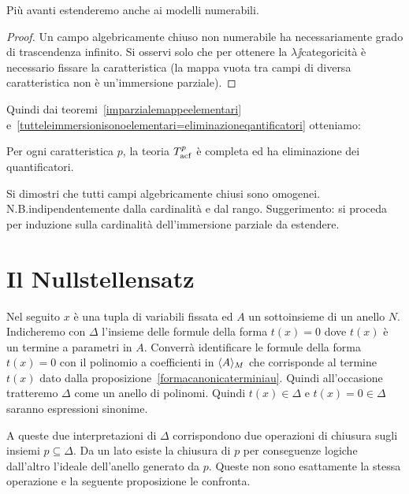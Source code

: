 Pi\`u avanti estenderemo  anche ai modelli numerabili.

\begin{proof}
Un campo algebricamente chiuso non numerabile ha necessariamente grado di trascendenza infinito. Si osservi solo che per ottenere la $\lambda\jj$categoricit\`a \`e necessario fissare la caratteristica (la mappa vuota tra campi di diversa caratteristica non \`e un'immersione parziale).\end{proof}

Quindi dai teoremi~\ref{imparzialemappeelementari} e~\ref{tutteleimmersionisonoelementari=eliminazioneqantificatori} otteniamo:

\begin{corollary}\label{corol_acfElQuan}
Per ogni caratteristica $p$, la teoria $T^p_{\rm acf}$ \`e completa ed ha eliminazione dei quantificatori.\QED
\end{corollary}


\begin{exercise}
Si dimostri che tutti campi algebricamente chiusi sono omogenei. N.B.\@ indipendentemente dalla cardinalit\`a e dal rango. Suggerimento: si proceda per induzione sulla cardinalit\`a dell'immersione parziale da estendere.\QED
\end{exercise}

\section{Il Nullstellensatz}

\def\ceq#1#2#3{\parbox{20ex}{$\displaystyle #1$}\parbox{6ex}{\hfil$\displaystyle #2$}$\displaystyle  #3$}

Nel seguito $x$ \`e una tupla di variabili fissata ed $A$ un sottoinsieme di un anello $N$. Indicheremo con $\Delta$ l'insieme delle formule della forma $t(x)=0$ dove $t(x)$ \`e un termine a parametri in $A$. Converr\`a identificare le formule della forma $t(x)=0$ con il polinomio a coefficienti in $\langle A\rangle_M$ che corrisponde al termine $t(x)$ dato dalla proposizione~\ref{formacanonicaterminiau}. Quindi all'occasione tratteremo $\Delta$ come un anello di polinomi. Quindi $t(x)\in\Delta$ e $t(x)=0\in\Delta$ saranno espressioni sinonime. 

A queste due interpretazioni di $\Delta$ corrispondono due operazioni di chiusura sugli insiemi $p\subseteq\Delta$. Da un lato esiste la  chiusura di $p$ per conseguenze logiche dall'altro l'ideale dell'anello generato da $p$. Queste non sono esattamente la stessa operazione e la seguente proposizione le confronta. 

